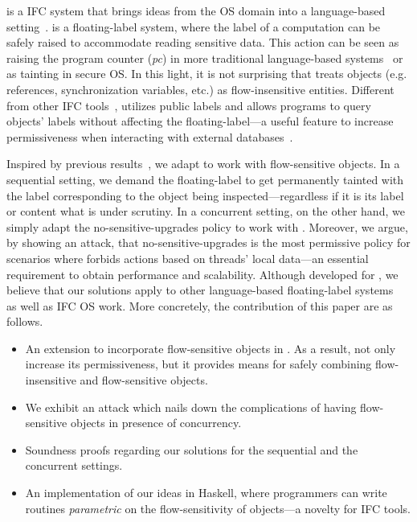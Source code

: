 {\LIO} is a IFC system that brings ideas from the OS domain into a language-based
setting~\citep{stefan:lio,stefan:addressing-covert}.  {\LIO} is a floating-label
system, where the label of a computation can be safely raised to accommodate
reading sensitive data. This action can be seen as raising the program counter
(\emph{pc}) in more traditional language-based
systems~\citep{sabelfeld:language-based-iflow} or as tainting in secure OS.  In
this light, it is not surprising that {\LIO} treats objects (e.g. references,
synchronization variables, etc.) as flow-insensitive entities. Different from
other IFC tools~\citep{jif,FlowCaml,Hedin13}, {\LIO} utilizes public labels and
allows programs to query objects' labels without affecting the
floating-label---a useful feature to increase permissiveness when interacting
with external databases~\citep{giffin:hails}.

Inspired by previous results~\citep{Austin:Flanagan:PLAS10}, we adapt {\LIO} to
work with flow-sensitive objects. In a sequential setting, we demand the
floating-label to get permanently tainted with the label corresponding to the
object being inspected---regardless if it is its label or content what is under
scrutiny. In a concurrent setting, on the other hand, we simply adapt the
no-sensitive-upgrades policy to work with \LIO. Moreover, we argue, by showing
an attack, that no-sensitive-upgrades is the most permissive policy for
scenarios where {\LIO} forbids actions based on threads' local data---an
essential requirement to obtain performance and scalability. Although developed
for {\LIO}, we believe that our solutions apply to other language-based
floating-label systems~\citep[e.g.][]{10.1109/SP.2013.10} as well as IFC OS
work.  More concretely, the contribution of this paper are as follows.
\begin{itemize}

\item An extension to incorporate flow-sensitive objects in {\LIO}. As a result,
  not only increase {\LIO} its permissiveness, but it provides means for safely
  combining flow-insensitive and flow-sensitive objects.


\item We exhibit an attack which nails down the complications of having
  flow-sensitive objects in presence of concurrency.

\item Soundness proofs regarding our solutions for the sequential and 
the concurrent settings. 

\item An implementation of our ideas in Haskell, where programmers can write
  routines \emph{parametric} on the flow-sensitivity of objects---a novelty for IFC
  tools. 
\end{itemize}

